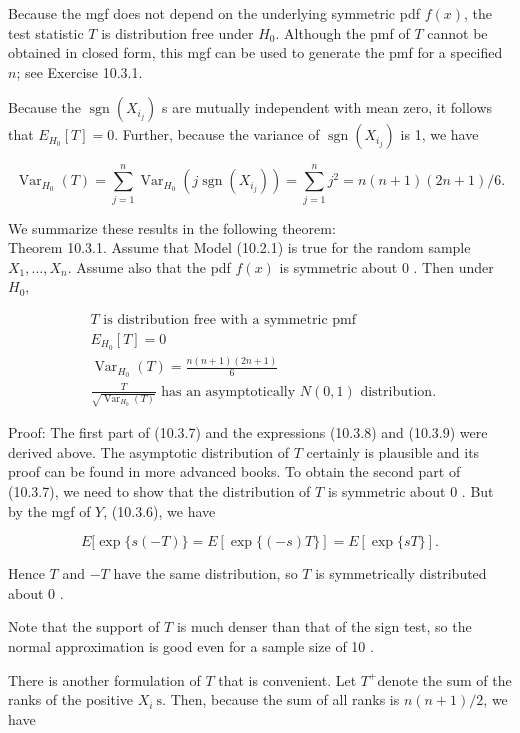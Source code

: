 Because the mgf does not depend on the underlying symmetric pdf $f(x)$, the test statistic $T$ is distribution free under $H_{0}$. Although the pmf of $T$ cannot be obtained in closed form, this mgf can be used to generate the pmf for a specified $n$; see Exercise 10.3.1.

Because the $\operatorname{sgn}\left(X_{i_{j}}\right)$ s are mutually independent with mean zero, it follows that $E_{H_{0}}[T]=0$. Further, because the variance of $\operatorname{sgn}\left(X_{i_{j}}\right)$ is 1, we have

$$
\operatorname{Var}_{H_{0}}(T)=\sum_{j=1}^{n} \operatorname{Var}_{H_{0}}\left(j \operatorname{sgn}\left(X_{i_{j}}\right)\right)=\sum_{j=1}^{n} j^{2}=n(n+1)(2 n+1) / 6 .
$$

We summarize these results in the following theorem:\\
Theorem 10.3.1. Assume that Model (10.2.1) is true for the random sample $X_{1}, \ldots, X_{n}$. Assume also that the pdf $f(x)$ is symmetric about 0 . Then under $H_{0}$,


\begin{align*}
& T \text { is distribution free with a symmetric pmf }  \tag{10.3.7}\\
& E_{H_{0}}[T]=0  \tag{10.3.8}\\
& \operatorname{Var}_{H_{0}}(T)=\frac{n(n+1)(2 n+1)}{6}  \tag{10.3.9}\\
& \frac{T}{\sqrt{\operatorname{Var}_{H_{0}}(T)}} \text { has an asymptotically } N(0,1) \text { distribution. } \tag{10.3.10}
\end{align*}


Proof: The first part of (10.3.7) and the expressions (10.3.8) and (10.3.9) were derived above. The asymptotic distribution of $T$ certainly is plausible and its proof can be found in more advanced books. To obtain the second part of (10.3.7), we need to show that the distribution of $T$ is symmetric about 0 . But by the mgf of $Y$, (10.3.6), we have

$$
E[\exp \{s(-T)\}=E[\exp \{(-s) T\}]=E[\exp \{s T\}] .
$$

Hence $T$ and $-T$ have the same distribution, so $T$ is symmetrically distributed about 0 .

Note that the support of $T$ is much denser than that of the sign test, so the normal approximation is good even for a sample size of 10 .

There is another formulation of $T$ that is convenient. Let $T^{+}$denote the sum of the ranks of the positive $X_{i} \mathrm{~s}$. Then, because the sum of all ranks is $n(n+1) / 2$, we have


